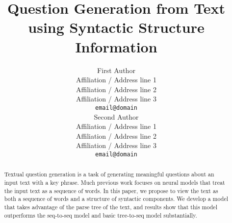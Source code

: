 \documentclass[11pt,a4paper]{article}
\title{Question Generation from Text using Syntactic Structure Information}
\author{First Author \\
  Affiliation / Address line 1 \\
  Affiliation / Address line 2 \\
  Affiliation / Address line 3 \\
  {\tt email@domain} \\\And
  Second Author \\
  Affiliation / Address line 1 \\
  Affiliation / Address line 2 \\
  Affiliation / Address line 3 \\
  {\tt email@domain} \\}
\date{}
\begin{document}
\maketitle
\begin{abstract}
Textual question generation is a task 
of generating meaningful questions about an input text with a key phrase. 
Much previous work focuses on neural models that treat the input text 
as a sequence of words. In this paper, we propose to view the text as 
both a sequence of words and a structure of syntactic components.
We develop a model that takes advantage of the parse tree of the text, 
and results show that this model outperforms the seq-to-seq model and basic tree-to-seq model
substantially. 
\end{abstract}









\end{document}
